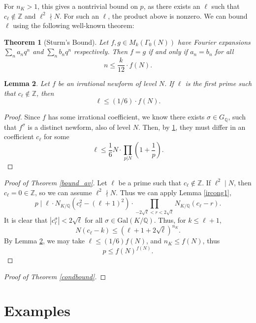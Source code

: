 \documentclass[12pt]{amsart}
\newtheorem{thm}{Theorem}[section]
\newtheorem{lem}[thm]{Lemma}
\theoremstyle{definition}
\def\Q{{\mathbb Q}}
\def\Z{{\mathbb Z}}
\newcommand{\notdiv}{\nmid}
\newcommand{\Gal}{\text{Gal}}
\begin{document}
For $n_K > 1$, this gives a nontrivial bound on $p$, as there exists an $\ell$ such that $c_\ell \notin \mathbb{Z}$ and $\ell^2 \nmid N$. For such an $\ell$, the product above is nonzero. We can bound $\ell$ using the following well-known theorem:
\begin{thm}[Sturm's Bound]\label{sturm}
Let $f,g \in M_k(\Gamma_0(N))$ have Fourier expansions $\sum_n a_nq^n$ and $\sum_n b_n q^n$ respectively.  Then $f = g$ if and only if $a_n = b_n$ for all
\[ n \leq \frac{k}{12} \cdot f(N). \]
\end{thm}

\begin{lem}\label{boundell}
Let $f$ be an irrational newform of level $N$.  If $\ell$ is the first prime such that $c_\ell \not\in \Z$, then
\[ \ell \leq (1/6) \cdot f(N) .\]
\end{lem}

\begin{proof}
Since $f$ has some irrational coefficient, we know there exists $\sigma \in G_\Q$, such that $f^{\sigma}$ is a distinct newform, also of level $N$.  Then, by \ref{sturm}, they must differ in an coefficient $c_\ell$ for some 
\[ \ell \leq \frac{1}{6} N \cdot \prod_{p|N} \left(1 + \frac{1}{p} \right). \]
\end{proof}

\begin{proof}[Proof of Theorem \ref{bound_av}]
Let $\ell$ be a prime such that $c_\ell \notin \Z$.  If $\ell^2 \mid N$, then $c_\ell = 0 \in \Z$, so we can assume $\ell^2 \notdiv N$. Thus we can apply Lemma \ref{ircong1}, 
\[ p \mid \ell \cdot N_{K / \mathbb{Q}}(c_\ell^2-(\ell+1)^2) \cdot \prod_{-2\sqrt{\ell} < r < 2\sqrt{\ell}}{N_{K / \mathbb{Q}}}(c_\ell - r).\]
It is clear that $|c_\ell^{\sigma}| < 2\sqrt{\ell}$ for all $\sigma \in \Gal(K/\Q)$. Thus, for $k \leq \ell+1$, \[N(c_\ell - k) \leq (\ell+1 + 2\sqrt{\ell})^{n_{K}}.\] 
By Lemma \ref{boundell}, we may take $\ell \leq (1/6)f(N)$, and $n_{K} \leq f(N)$, thus
\[ p \leq f(N)^{f(N)}. \]
\end{proof}
 
 
 \begin{proof}[Proof of Theorem \ref{condbound}]
 
 
 \end{proof}

\section{Examples}\label{examples}
\end{document}
